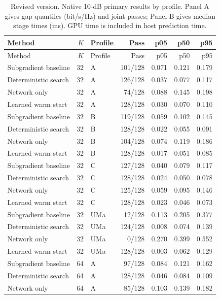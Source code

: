 \documentclass[10pt,letterpaper]{article}
\begin{document}
\begingroup\color{blue}\begingroup\small\setlength{\tabcolsep}{4pt}
\begin{longtable}{lrlrrrr}\caption{Revised version. Native 10-dB primary results by profile. Panel A gives gap quantiles (bit/s/Hz) and joint passes; Panel B gives median stage times (ms). GPU time is included in host prediction time.}\label{supp:table3}\\
\toprule Method & $K$ & Profile & Pass & p05 & p50 & p95\\\midrule\endfirsthead\toprule Method & $K$ & Profile & Pass & p05 & p50 & p95\\\midrule\endhead\bottomrule\endfoot
Subgradient baseline & 32 & A & 101/128 & 0.071 & 0.121 & 0.179\\
Deterministic search & 32 & A & 126/128 & 0.037 & 0.077 & 0.117\\
Network only & 32 & A & 74/128 & 0.088 & 0.145 & 0.198\\
Learned warm start & 32 & A & 128/128 & 0.030 & 0.070 & 0.110\\
Subgradient baseline & 32 & B & 119/128 & 0.059 & 0.102 & 0.145\\
Deterministic search & 32 & B & 128/128 & 0.022 & 0.055 & 0.091\\
Network only & 32 & B & 104/128 & 0.074 & 0.119 & 0.186\\
Learned warm start & 32 & B & 128/128 & 0.017 & 0.051 & 0.085\\
Subgradient baseline & 32 & C & 127/128 & 0.040 & 0.079 & 0.117\\
Deterministic search & 32 & C & 128/128 & 0.024 & 0.050 & 0.078\\
Network only & 32 & C & 125/128 & 0.059 & 0.095 & 0.146\\
Learned warm start & 32 & C & 128/128 & 0.023 & 0.046 & 0.073\\
Subgradient baseline & 32 & UMa & 12/128 & 0.113 & 0.205 & 0.377\\
Deterministic search & 32 & UMa & 124/128 & 0.008 & 0.074 & 0.139\\
Network only & 32 & UMa & 0/128 & 0.270 & 0.399 & 0.552\\
Learned warm start & 32 & UMa & 128/128 & 0.003 & 0.062 & 0.129\\
Subgradient baseline & 64 & A & 97/128 & 0.084 & 0.121 & 0.162\\
Deterministic search & 64 & A & 128/128 & 0.046 & 0.084 & 0.109\\
Network only & 64 & A & 85/128 & 0.103 & 0.139 & 0.182\\

\end{longtable}
\end{document}

